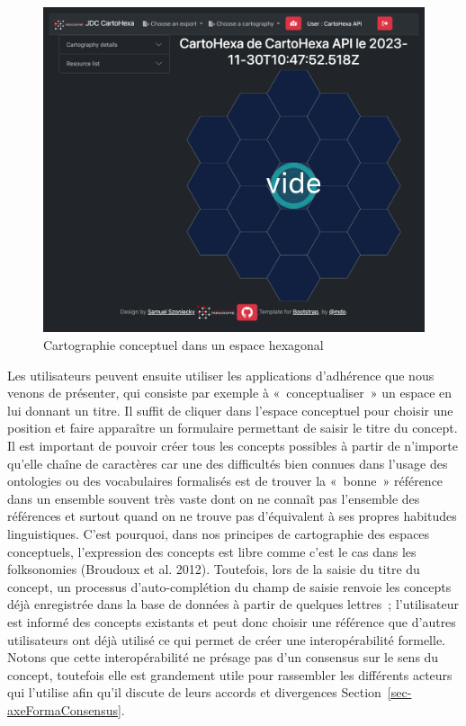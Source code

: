 \documentclass[
  letterpaper,
  DIV=11,
  numbers=noendperiod]{scrreprt}
\begin{document}
\begin{figure}

{\centering \includegraphics{images/localhost_samszo_HDR_docs_jdcCartoHexa.html.png}

}

\caption{\label{fig-cartoHexa}Cartographie conceptuel dans un espace
hexagonal}

\end{figure}

Les utilisateurs peuvent ensuite utiliser les applications d'adhérence
que nous venons de présenter, qui consiste par exemple à
«~conceptualiser~» un espace en lui donnant un titre. Il suffit de
cliquer dans l'espace conceptuel pour choisir une position et faire
apparaître un formulaire permettant de saisir le titre du concept. Il
est important de pouvoir créer tous les concepts possibles à partir de
n'importe qu'elle chaîne de caractères car une des difficultés bien
connues dans l'usage des ontologies ou des vocabulaires formalisés est
de trouver la «~bonne~» référence dans un ensemble souvent très vaste
dont on ne connaît pas l'ensemble des références et surtout quand on ne
trouve pas d'équivalent à ses propres habitudes linguistiques. C'est
pourquoi, dans nos principes de cartographie des espaces conceptuels,
l'expression des concepts est libre comme c'est le cas dans les
folksonomies (Broudoux et al. 2012). Toutefois, lors de la saisie du
titre du concept, un processus d'auto-complétion du champ de saisie
renvoie les concepts déjà enregistrée dans la base de données à partir
de quelques lettres~; l'utilisateur est informé des concepts existants
et peut donc choisir une référence que d'autres utilisateurs ont déjà
utilisé ce qui permet de créer une interopérabilité formelle. Notons que
cette interopérabilité ne présage pas d'un consensus sur le sens du
concept, toutefois elle est grandement utile pour rassembler les
différents acteurs qui l'utilise afin qu'il discute de leurs accords et
divergences Section~\ref{sec-axeFormaConsensus}.
\end{document}
